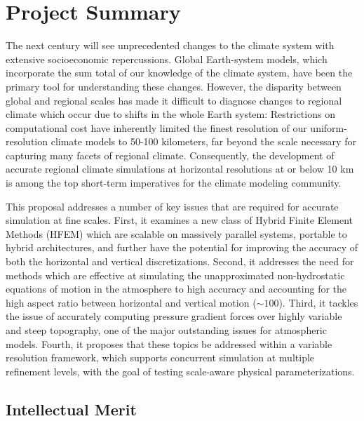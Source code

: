 \documentclass[11pt]{article}
\begin{document}
\appendix

\addtocounter{section}{1}

\section{Project Summary}
\vspace{-0.2cm}

The next century will see unprecedented changes to the climate system with extensive socioeconomic repercussions.  Global Earth-system models, which incorporate the sum total of our knowledge of the climate system, have been the primary tool for understanding these changes.  However, the disparity between global and regional scales has made it difficult to diagnose changes to regional climate which occur due to shifts in the whole Earth system:  Restrictions on computational cost have inherently limited the finest resolution of our uniform-resolution climate models to 50-100 kilometers, far beyond the scale necessary for capturing many facets of regional climate.  Consequently, the development of accurate regional climate simulations at horizontal resolutions at or below 10 km is among the top short-term imperatives for the climate modeling community.

This proposal addresses a number of key issues that are required for accurate simulation at fine scales.  First, it examines a new class of Hybrid Finite Element Methods (HFEM) which are scalable on massively parallel systems, portable to hybrid architectures, and further have the potential for improving the accuracy of both the horizontal and vertical discretizations.  Second, it addresses the need for methods which are effective at simulating the unapproximated non-hydrostatic equations of motion in the atmosphere to high accuracy and accounting for the high aspect ratio between horizontal and vertical motion ($\sim 100$).  Third, it tackles the issue of accurately computing pressure gradient forces over highly variable and steep topography, one of the major outstanding issues for atmospheric models.  Fourth, it proposes that these topics be addressed within a variable resolution framework, which supports concurrent simulation at multiple refinement levels, with the goal of testing scale-aware physical parameterizations.

\vspace{-0.5cm}
\subsection*{Intellectual Merit}
\vspace{-0.5cm}
\end{document}
